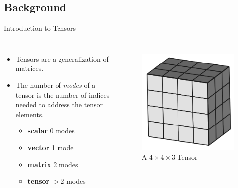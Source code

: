 \documentclass[handout]{beamer}
\begin{document}
\subsection{Background}
\begin{frame}{Introduction to Tensors}
\begin{columns}
\begin{itemize}[<+->]
\item Tensors are a generalization of matrices.
\item The number of {\em modes} of a tensor is the number of indices needed to address the tensor elements.
  \begin{itemize}[<+->]
  \item {\bf scalar} 0 modes
  \item {\bf vector} 1 mode
  \item {\bf matrix} 2 modes
  \item {\bf tensor} $>2$ modes
  \end{itemize}
\end{itemize}
\begin{figure}
\centering
\includegraphics[width=\textwidth]{diagrams/tensor}
{\small A $4\times4\times3$ Tensor}
\end{figure}
\end{columns}
\end{frame}
\end{document}
